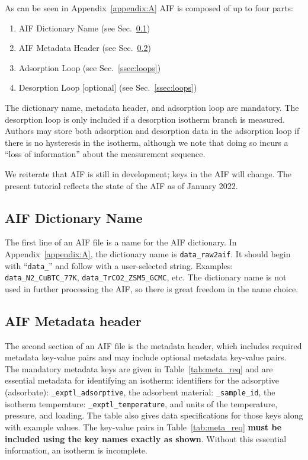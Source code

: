 \documentclass[preprint,pre,showkeys,12pt,superscriptaddress,nofootinbib,endfloats*]{revtex4-1}
\begin{document}
As can be seen in Appendix~\ref{appendix:A} AIF is composed of up to four parts:

\begin{enumerate}
\item AIF Dictionary Name (see Sec.~\ref{ssec:name})
\item AIF Metadata Header (see Sec.~\ref{ssec:metadata})
\item Adsorption Loop (see Sec.~\ref{ssec:loops})
\item Desorption Loop [optional] (see Sec.~\ref{ssec:loops})
\end{enumerate}

The dictionary name, metadata header, and adsorption loop are mandatory. The desorption loop is only included if a desorption isotherm branch is measured. Authors may store both adsorption and desorption data in the adsorption loop if there is no hysteresis in the isotherm, although we note that doing so incurs a ``loss of information'' about the measurement sequence.

We reiterate that AIF is still in development; keys in the AIF will change. The present tutorial reflects the state of the AIF as of January 2022.

\subsection{AIF Dictionary Name}\label{ssec:name}

The first line of an AIF file is a name for the AIF dictionary. In Appendix~\ref{appendix:A}, the dictionary name is \verb!data_raw2aif!. It should begin with ``\verb!data_!'' and follow with a user-selected string. Examples: \verb!data_N2_CuBTC_77K!, \verb!data_TrCO2_ZSM5_GCMC!, etc. The dictionary name is not used in further processing the AIF, so there is great freedom in the name choice.

\subsection{AIF Metadata header}\label{ssec:metadata}

The second section of an AIF file is the metadata header, which includes required metadata key-value pairs and may include optional metadata key-value pairs. The mandatory metadata keys are given in Table~\ref{tab:meta_req} and are essential metadata for identifying an isotherm: identifiers for the adsorptive (adsorbate): \verb!_exptl_adsorptive!, the adsorbent material: \verb!_sample_id!, the isotherm temperature: \verb!_exptl_temperature!, and units of the temperature, pressure, and loading. The table also gives data specifications for those keys along with example values. The key-value pairs in Table~\ref{tab:meta_req} {\bf must be included using the key names exactly as shown}. Without this essential information, an isotherm is incomplete.
\end{document}
